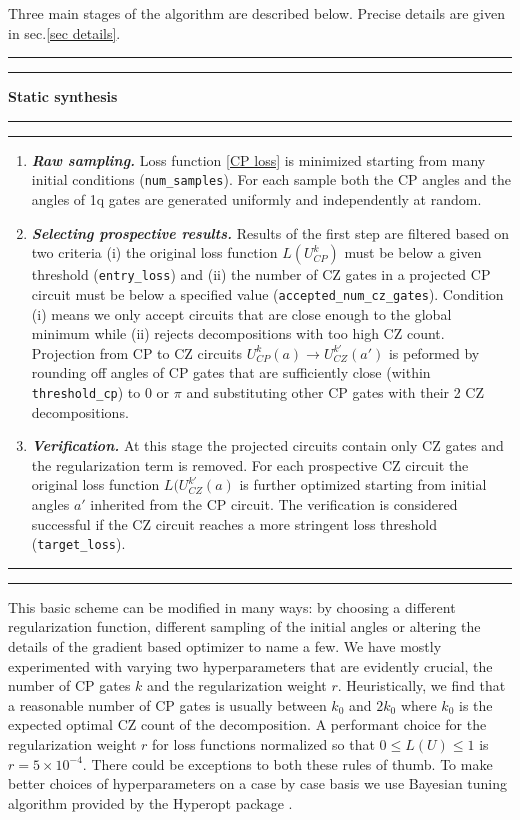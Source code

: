 \documentclass[twocolumn, amsfonts, amssymb, aps, nofootinbib]{revtex4-2}
\newcommand{\CZ}{CZ }
\newcommand{\CP}{CP }
\newcommand{\package}[1]{\textrm {#1 }}
\newcommand{\param}[1]{\texttt{#1}}
\begin{document}
Three main stages of the algorithm are described below. Precise details are given in sec.\ref{sec details}.
\\[6pt]
\hrule
\hrule
\vspace{6pt}
{\large\textbf{\qquad Static synthesis}}
\vspace{6pt}
\hrule
\hrule
\begin{enumerate}
\item \textit{\textbf{ Raw sampling.}} Loss function \eqref{CP loss} is minimized starting from many initial conditions (\param{num\_samples}). For each sample both the \CP angles and the angles of 1q gates are generated uniformly and independently at random. 
\item \textit{\textbf{Selecting prospective results.}} Results of the first step are filtered based on two criteria (i) the original loss function $L(U^k_{CP})$ must be below a given threshold (\param{entry\_loss}) and (ii) the number of \CZ gates in a projected \CP circuit must be below a specified value (\param{accepted\_num\_cz\_gates}). Condition (i) means we only accept circuits that are close enough to the global minimum while (ii) rejects decompositions with too high \CZ count. Projection from \CP to \CZ circuits $U_{CP}^k(a)\to U_{CZ}^{k'}(a')$ is peformed by rounding off angles of \CP gates that are sufficiently close (within \param{threshold\_cp}) to $0$ or $\pi$ and substituting other \CP gates with their 2 \CZ decompositions. 
\item \textit{\textbf{Verification.}} At this stage the projected circuits contain only \CZ gates and the regularization term is removed. For each prospective \CZ circuit the original loss function $L(U_{CZ}^{k'}(a)$ is further optimized starting from initial angles $a'$ inherited from the \CP circuit. The verification is considered successful if the \CZ circuit reaches a more stringent loss threshold (\param{target\_loss}). 
\end{enumerate}
\hrule
\hrule
\vspace{20pt}

This basic scheme can be modified in many ways: by choosing a different regularization function, different sampling of the initial angles or altering the details of the gradient based optimizer to name a few. We have mostly experimented with varying two hyperparameters that are evidently crucial, the number of \CP gates $k$ and the regularization weight $r$. Heuristically, we find that a reasonable number of \CP gates is usually between $k_0$ and $2k_0$ where $k_0$ is the expected optimal \CZ count of the decomposition. A performant choice for the regularization weight $r$ for loss functions normalized so that $0\le L(U) \le 1$ is $r=5\times 10^{-4}$. There could be exceptions to both these rules of thumb. To make better choices of hyperparameters on a case by case basis we use Bayesian tuning algorithm provided by the \package{Hyperopt} package \cite{hyperopt}.
\end{document}
